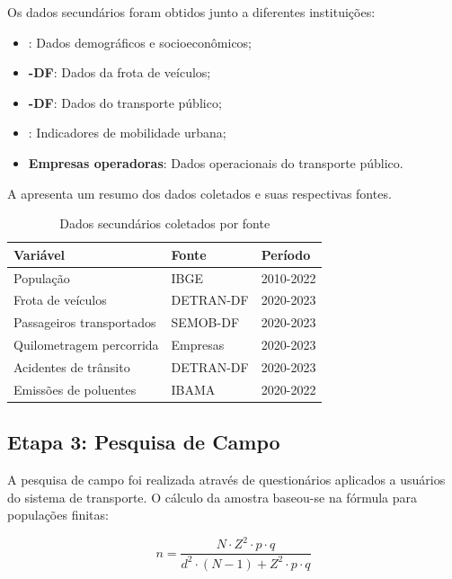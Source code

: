 Os dados secundários foram obtidos junto a diferentes instituições:

\begin{itemize}
    \item \textbf{}: Dados demográficos e socioeconômicos;
    \item \textbf{-DF}: Dados da frota de veículos;
    \item \textbf{-DF}: Dados do transporte público;
    \item \textbf{}: Indicadores de mobilidade urbana;
    \item \textbf{Empresas operadoras}: Dados operacionais do transporte público.
\end{itemize}

A  apresenta um resumo dos dados coletados e suas respectivas fontes.

\begin{table}[htb]
    \centering
    \caption{Dados secundários coletados por fonte}
    \label{tab:dados-secundarios}
    \begin{tabular}{lll}
        \toprule
        \textbf{Variável} & \textbf{Fonte} & \textbf{Período} \\
        \midrule
        População & IBGE & 2010-2022 \\
        Frota de veículos & DETRAN-DF & 2020-2023 \\
        Passageiros transportados & SEMOB-DF & 2020-2023 \\
        Quilometragem percorrida & Empresas & 2020-2023 \\
        Acidentes de trânsito & DETRAN-DF & 2020-2023 \\
        Emissões de poluentes & IBAMA & 2020-2022 \\
        \bottomrule
    \end{tabular}
\end{table}

\subsection{Etapa 3: Pesquisa de Campo}

A pesquisa de campo foi realizada através de questionários aplicados a usuários do sistema de transporte. O cálculo da amostra baseou-se na fórmula para populações finitas:

\begin{equation}
n = \frac{N \cdot Z^2 \cdot p \cdot q}{d^2 \cdot (N-1) + Z^2 \cdot p \cdot q}
\label{eq:amostra}
\end{equation}

